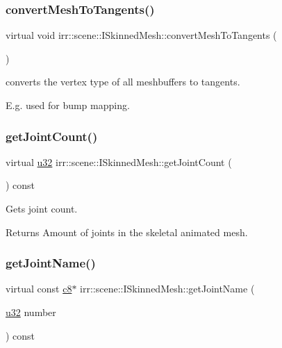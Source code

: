 \subsubsection{\texorpdfstring{convert\+Mesh\+To\+Tangents()}{convertMeshToTangents()}}
{\footnotesize\ttfamily virtual void irr\+::scene\+::\+I\+Skinned\+Mesh\+::convert\+Mesh\+To\+Tangents (\begin{DoxyParamCaption}{ }\end{DoxyParamCaption})\hspace{0.3cm}{\ttfamily [pure virtual]}}



converts the vertex type of all meshbuffers to tangents. 

E.\+g. used for bump mapping. \mbox{\label{classirr_1_1scene_1_1ISkinnedMesh_a7715fb82ffec225d2fd9b8aa860e3c38}} 
\subsubsection{\texorpdfstring{get\+Joint\+Count()}{getJointCount()}}
{\footnotesize\ttfamily virtual \hyperlink{namespaceirr_a0416a53257075833e7002efd0a18e804}{u32} irr\+::scene\+::\+I\+Skinned\+Mesh\+::get\+Joint\+Count (\begin{DoxyParamCaption}{ }\end{DoxyParamCaption}) const\hspace{0.3cm}{\ttfamily [pure virtual]}}



Gets joint count. 

\begin{DoxyReturn}{Returns}
Amount of joints in the skeletal animated mesh. 
\end{DoxyReturn}
\mbox{\label{classirr_1_1scene_1_1ISkinnedMesh_ab28aed78a7e2eeaa20ba7eb0eb082ba4}} 
\subsubsection{\texorpdfstring{get\+Joint\+Name()}{getJointName()}}
{\footnotesize\ttfamily virtual const \hyperlink{namespaceirr_a9395eaea339bcb546b319e9c96bf7410}{c8}$\ast$ irr\+::scene\+::\+I\+Skinned\+Mesh\+::get\+Joint\+Name (\begin{DoxyParamCaption}\item[{\hyperlink{namespaceirr_a0416a53257075833e7002efd0a18e804}{u32}}]{number }\end{DoxyParamCaption}) const\hspace{0.3cm}{\ttfamily [pure virtual]}}



